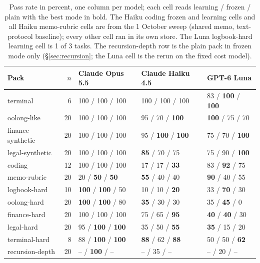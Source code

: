 \documentclass[11pt,a4paper]{article}
\begin{document}
\begin{table}[htbp]
\centering
\small
\begin{tabular}{@{}lrlll@{}}
\toprule
Pack & $n$ & Claude Opus 5.5 & Claude Haiku 4.5 & GPT-6 Luna \\
\midrule
terminal          & 6  & 100 / 100 / 100 & 100 / 100 / 100 & 83 / \textbf{100} / \textbf{100} \\
oolong-like       & 20 & 100 / 100 / 100 & 95 / 70 / \textbf{100} & \textbf{100} / 75 / 70 \\
finance-synthetic & 20 & 100 / 100 / 100 & 95 / \textbf{100} / \textbf{100} & 75 / 70 / \textbf{100} \\
legal-synthetic   & 20 & 100 / 100 / 100 & \textbf{85} / 70 / 75 & 75 / 90 / \textbf{100} \\
coding            & 12 & 100 / 100 / 100 & 17 / 17 / \textbf{33} & 83 / \textbf{92} / 75 \\
memo-rubric       & 20 & 20 / \textbf{50} / \textbf{50} & \textbf{55} / 40 / 40 & \textbf{90} / 40 / 55 \\
logbook-hard      & 10 & \textbf{100} / \textbf{100} / 50 & 10 / 10 / \textbf{20} & 33 / \textbf{70} / 30 \\
\addlinespace
oolong-hard       & 20 & \textbf{100} / \textbf{100} / 80 & \textbf{35} / 30 / 30 & 35 / \textbf{45} / 0 \\
finance-hard      & 20 & 100 / 100 / 100 & 75 / 65 / \textbf{95} & \textbf{40} / \textbf{40} / 30 \\
legal-hard        & 20 & 95 / \textbf{100} / \textbf{100} & 35 / 50 / \textbf{55} & \textbf{35} / 15 / 20 \\
terminal-hard     & 8  & 88 / \textbf{100} / \textbf{100} & \textbf{88} / 62 / \textbf{88} & 50 / 50 / \textbf{62} \\
\addlinespace
recursion-depth   & 20 & -- / \textbf{100} / -- & -- / 35 / -- & -- / 20 / -- \\
\bottomrule
\end{tabular}
\caption{Pass rate in percent, one column per model; each cell reads
learning / frozen / plain with the best mode in bold. The Haiku coding frozen
and learning cells and all Haiku memo-rubric cells are from the 1 October
sweep (shared memo, text-protocol baseline); every other cell ran in its own
store. The Luna logbook-hard learning cell is 1 of 3 tasks. The
recursion-depth row is the plain pack in frozen mode only
(\S\ref{sec:recursion}; the Luna cell is the rerun on the fixed cost
model).}
\label{tab:glance}
\end{table}
\end{document}
